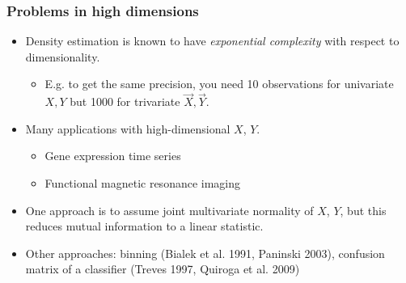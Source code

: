 \documentclass{beamer}
\begin{document}
\begin{frame}
\frametitle{Problems in high dimensions}
\begin{itemize}
\item Density estimation is known to have \emph{exponential complexity} with respect to dimensionality.
\begin{itemize}
\item E.g. to get the same precision, you need 10 observations for univariate $X, Y$ but 1000 for trivariate $\vec{X}, \vec{Y}$. \pause
\end{itemize}
\item Many applications with high-dimensional $X$, $Y$.
\begin{itemize}
\item Gene expression time series
\item Functional magnetic resonance imaging \pause
\end{itemize}
\item One approach is to assume joint multivariate normality of $X$, $Y$, but this reduces mutual information to a linear statistic. \pause
\item Other approaches: binning (Bialek et al. 1991, Paninski 2003), confusion matrix of a classifier (Treves 1997, Quiroga et al. 2009)
\end{itemize}
\end{frame}
\end{document}

